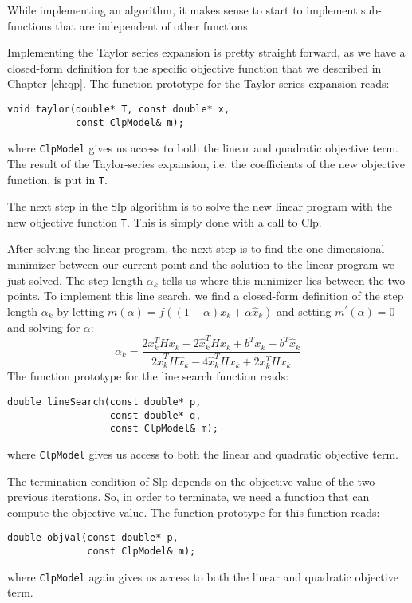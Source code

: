 While implementing an algorithm, it makes sense to start to implement
sub-functions that are independent of other functions.

Implementing the Taylor series expansion is pretty straight forward, as
we have a closed-form definition for the specific objective function that
we described in Chapter \ref{ch:qp}. The function prototype for the
Taylor series expansion reads:
\begin{verbatim}
void taylor(double* T, const double* x,
            const ClpModel& m);
\end{verbatim}
where \texttt{ClpModel} gives us access to both the linear and quadratic
objective term. The result of the Taylor-series expansion, i.e. the 
coefficients of the new objective function, is put in \texttt{T}.

The next step in the Slp algorithm is to solve the new linear program with the
new objective function \texttt{T}. This is simply done with a call to Clp.

After solving the linear program, the next step is to find the one-dimensional
minimizer between our current point and the solution to the linear program we
just solved.
The step length $\alpha_k$ tells us where this minimizer lies between the two
points.
To implement this line search, we find a closed-form definition of the step
length $\alpha_k$ by letting $m(\alpha) = f((1-\alpha) x_k + \alpha \hat{x}_k)$
and setting $m^\prime(\alpha) = 0$ and solving for $\alpha$:
\[
\alpha_k = \frac{
                2x_k^T H x_k
                - 2\hat{x}_k^T H x_k
                + b^T x_k - b^T \hat{x}_k
                }{
                  2\hat{x}_k^T H \hat{x}_k
                - 4\hat{x}_k^T H x_k
                + 2x_k^T H x_k
                }
\]
The function prototype for the line search function reads:
\begin{verbatim}
double lineSearch(const double* p,
                  const double* q,
                  const ClpModel& m);
\end{verbatim}
where \texttt{ClpModel} gives us access to both the linear and quadratic
objective term.

The termination condition of Slp depends on the objective value of the two
previous iterations. So, in order to terminate, we need a function that can
compute the objective value. The function prototype for this function reads:
\begin{verbatim}
double objVal(const double* p,
              const ClpModel& m);
\end{verbatim}
where \texttt{ClpModel} again gives us access to both the linear and quadratic
objective term.

